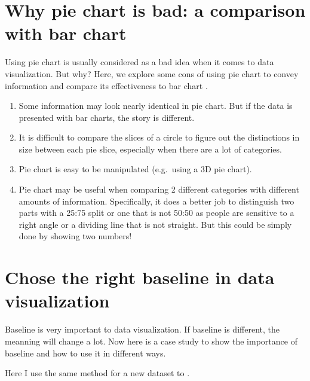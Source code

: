 \documentclass[]{book}
\theoremstyle{definition}
\theoremstyle{definition}
\theoremstyle{definition}
\theoremstyle{remark}
\begin{document}
\section{Why pie chart is bad: a comparison with bar
chart}\label{why-pie-chart-is-bad-a-comparison-with-bar-chart}

Using pie chart is usually considered as a bad idea when it comes to
data visualization. But why? Here, we explore some cons of using pie
chart to convey information and compare its effectiveness to bar chart
\citep{hickey-pie-worst} \citep{henry-defense-pie} \citep{quach-penny}.

\begin{enumerate}
\def\labelenumi{\arabic{enumi}.}
\item
  Some information may look nearly identical in pie chart. But if the
  data is presented with bar charts, the story is different.
\item
  It is difficult to compare the slices of a circle to figure out the
  distinctions in size between each pie slice, especially when there are
  a lot of categories.
\item
  Pie chart is easy to be manipulated (e.g.~using a 3D pie chart).
\item
  Pie chart may be useful when comparing 2 different categories with
  different amounts of information. Specifically, it does a better job
  to distinguish two parts with a 25:75 split or one that is not 50:50
  as people are sensitive to a right angle or a dividing line that is
  not straight. But this could be simply done by showing two numbers!
\end{enumerate}

\section{Chose the right baseline in data
visualization}\label{chose-the-right-baseline-in-data-visualization}

Baseline is very important to data visualization. If baseline is
different, the meanning will change a lot. Now here is a case study to
show the importance of baseline and how to use it in different ways.

Here I use the same method for a new dataset to .
\end{document}
